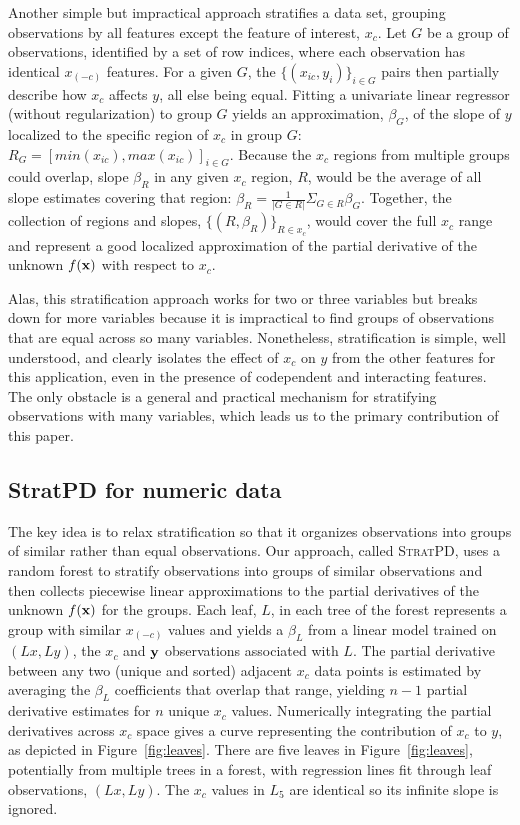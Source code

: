 \documentclass[12pt]{article}
\newcommand{\figref}[1]{Figure~\ref{#1}}
\newcommand{\spd}{\fontfamily{cmr}\textsc{\small StratPD}}
\begin{document}
Another simple but impractical approach stratifies a data set, grouping observations by all features except the feature of interest, $x_c$.  Let $G$ be a group of observations, identified by a set of row indices, where each observation has identical $x_{(-c)}$ features. For a given $G$, the $\{(x_{ic},  y_i)\}_{i \in G}$ pairs then partially describe how $x_c$ affects $y$, all else being equal.  Fitting a univariate linear regressor (without regularization) to group $G$ yields an approximation, $\beta_G$, of the slope of $y$ localized to the specific region of $x_c$ in group $G$: $R_G = [min(x_{ic}), max(x_{ic})]_{i \in G}$.   Because the $x_c$ regions from multiple groups could overlap, slope $\beta_R$ in any given $x_c$ region, $R$, would be the average of all slope estimates covering that region: $\beta_R = \frac{1}{|G \in R|}\Sigma_{G \in R}\beta_G$. Together, the collection of regions and slopes, $\{(R, \beta_R)\}_{R \in x_c}$, would cover the full $x_c$ range and represent a good localized approximation of the partial derivative of the unknown $f(\bf x)$ with respect to $x_c$.

Alas, this stratification approach works for two or three variables but breaks down for more variables because it is impractical to find groups of observations that are equal across so many variables.  Nonetheless, stratification is simple, well understood, and clearly isolates the effect of $x_c$ on $y$ from the other features for this application, even in the presence of codependent and interacting features.  The only obstacle is a general and practical mechanism for stratifying observations with many variables, which leads us to the primary contribution of this paper.

\subsection{StratPD for numeric data}

The key idea is to relax stratification so that it organizes observations into groups of similar rather than equal observations.  Our approach, called \spd, uses a random forest to stratify observations into  groups of similar observations and then collects piecewise linear approximations to the partial derivatives of the unknown $f(\bf x)$ for the groups. Each leaf, $L$, in each tree of the forest represents a group with similar $x_{(-c)}$ values and yields a $\beta_L$ from a linear model trained on $(Lx, Ly)$, the $x_c$ and $\bf y$ observations associated with $L$.  The partial derivative between any two (unique and sorted) adjacent $x_c$ data points is estimated by averaging the $\beta_L$ coefficients that overlap that range, yielding $n-1$ partial derivative estimates for $n$ unique $x_c$ values.  Numerically integrating the partial derivatives across $x_c$ space gives a curve representing the contribution of $x_c$ to $y$, as depicted in \figref{fig:leaves}. There are five leaves in \figref{fig:leaves}, potentially from multiple trees in a forest, with regression lines fit through leaf observations, $(Lx, Ly)$. The $x_c$ values in $L_5$ are identical so its infinite slope is ignored.
\end{document}
